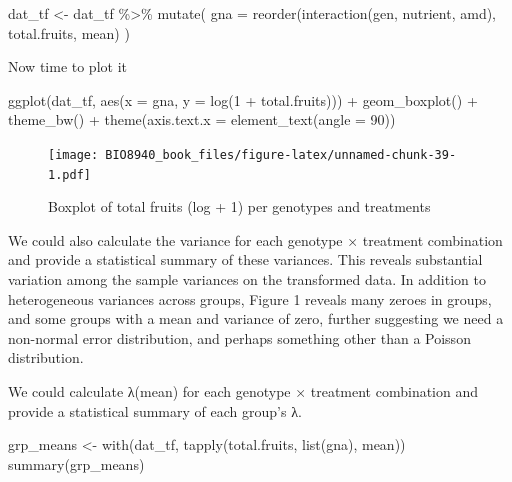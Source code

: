 \documentclass[
  12pt,
]{book}
\newenvironment{Shaded}{\begin{snugshade}}{\end{snugshade}}
\newcommand{\AttributeTok}[1]{\textcolor[rgb]{0.77,0.63,0.00}{#1}}
\newcommand{\DecValTok}[1]{\textcolor[rgb]{0.00,0.00,0.81}{#1}}
\newcommand{\FunctionTok}[1]{\textcolor[rgb]{0.00,0.00,0.00}{#1}}
\newcommand{\NormalTok}[1]{#1}
\newcommand{\OtherTok}[1]{\textcolor[rgb]{0.56,0.35,0.01}{#1}}
\newcommand{\SpecialCharTok}[1]{\textcolor[rgb]{0.00,0.00,0.00}{#1}}
\begin{document}
\begin{Shaded}
\begin{Highlighting}[]
\NormalTok{dat\_tf }\OtherTok{\textless{}{-}}\NormalTok{ dat\_tf }\SpecialCharTok{\%\textgreater{}\%}
  \FunctionTok{mutate}\NormalTok{(}
    \AttributeTok{gna =} \FunctionTok{reorder}\NormalTok{(}\FunctionTok{interaction}\NormalTok{(gen, nutrient, amd), total.fruits, mean)}
\NormalTok{  )}
\end{Highlighting}
\end{Shaded}

Now time to plot it

\begin{Shaded}
\begin{Highlighting}[]
\FunctionTok{ggplot}\NormalTok{(dat\_tf, }\FunctionTok{aes}\NormalTok{(}\AttributeTok{x =}\NormalTok{ gna, }\AttributeTok{y =} \FunctionTok{log}\NormalTok{(}\DecValTok{1} \SpecialCharTok{+}\NormalTok{ total.fruits))) }\SpecialCharTok{+}
  \FunctionTok{geom\_boxplot}\NormalTok{() }\SpecialCharTok{+}
  \FunctionTok{theme\_bw}\NormalTok{() }\SpecialCharTok{+}
  \FunctionTok{theme}\NormalTok{(}\AttributeTok{axis.text.x =} \FunctionTok{element\_text}\NormalTok{(}\AttributeTok{angle =} \DecValTok{90}\NormalTok{))}
\end{Highlighting}
\end{Shaded}

\begin{figure}
\centering
\texttt{[image: BIO8940\_book\_files/figure-latex/unnamed-chunk-39-1.pdf]}
\caption{\label{fig:unnamed-chunk-39}Boxplot of total fruits (log + 1) per genotypes and treatments}
\end{figure}

We could also calculate the variance for each genotype × treatment combination and provide a statistical summary of these variances.
This reveals substantial variation among the sample variances on the transformed data. In addition to heterogeneous variances across groups, Figure 1 reveals many zeroes in groups, and some groups with a mean and variance of zero, further suggesting we need a non-normal error distribution, and perhaps something other than a Poisson distribution.

We could calculate λ(mean) for each genotype × treatment combination and provide a statistical summary of each group's λ.

\begin{Shaded}
\begin{Highlighting}[]
\NormalTok{grp\_means }\OtherTok{\textless{}{-}} \FunctionTok{with}\NormalTok{(dat\_tf, }\FunctionTok{tapply}\NormalTok{(total.fruits, }\FunctionTok{list}\NormalTok{(gna), mean))}
\FunctionTok{summary}\NormalTok{(grp\_means)}
\end{Highlighting}
\end{Shaded}
\end{document}
